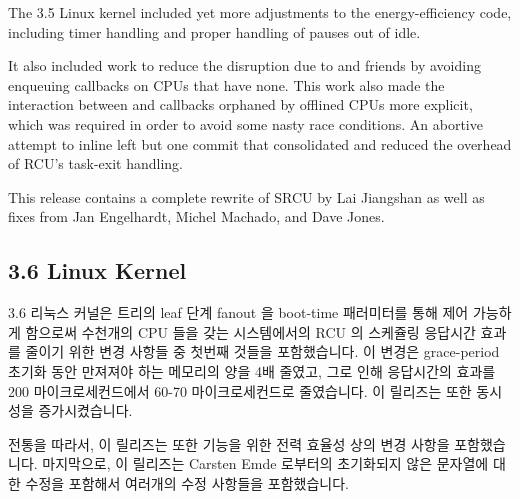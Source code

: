 The 3.5 Linux kernel included yet more adjustments to the
 energy-efficiency code, including timer
handling and proper handling of  pauses out of
idle.

It also included work to reduce the disruption due to 
and friends by avoiding enqueuing callbacks on CPUs that have none.
This work also made the interaction between  and
callbacks orphaned by offlined CPUs more explicit, which was required
in order to avoid some nasty race conditions.
An abortive attempt to inline  left but one
commit that consolidated and reduced the overhead of RCU's
task-exit handling.

This release contains a complete rewrite of SRCU by Lai Jiangshan as
well as fixes from Jan Engelhardt, Michel Machado, and Dave Jones.
\fi

\subsection{3.6 Linux Kernel}

3.6 리눅스 커널은  트리의 leaf 단계 fanout 을 boot-time 패러미터를
통해 제어 가능하게 함으로써 수천개의 CPU 들을 갖는 시스템에서의 RCU 의 스케쥴링
응답시간 효과를 줄이기 위한 변경 사항들 중 첫번째 것들을 포함했습니다.
이 변경은 grace-period 초기화 동안 만져져야 하는 메모리의 양을 4배 줄였고, 그로
인해 응답시간의 효과를 200 마이크로세컨드에서 60-70 마이크로세컨드로
줄였습니다.
이 릴리즈는 또한  동시성을 증가시켰습니다.

전통을 따라서, 이 릴리즈는 또한  기능을 위한 전력
효율성 상의 변경 사항을 포함했습니다.
마지막으로, 이 릴리즈는 Carsten Emde 로부터의 초기화되지 않은 문자열에 대한
수정을 포함해서 여러개의 수정 사항들을 포함했습니다.

